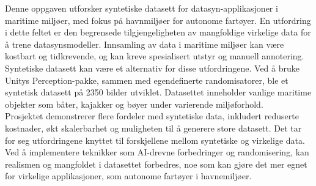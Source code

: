 

Denne oppgaven utforsker syntetiske datasett for datasyn-applikasjoner i maritime miljøer, med fokus på havnmiljøer for autonome fartøyer. En utfordring i dette feltet er den begrensede tilgjengeligheten av mangfoldige virkelige data for å trene datasynsmodeller. Innsamling av data i maritime miljøer kan være kostbart og tidkrevende, og kan kreve spesialisert utstyr og manuell annotering. Syntetiske datasett kan være et alternativ for disse utfordringene. Ved å bruke Unitys Perception-pakke, sammen med egendefinerte randomisatorer, ble et syntetisk datasett på 2350 bilder utviklet. Datasettet inneholder vanlige maritime objekter som båter, kajakker og bøyer under varierende miljøforhold.\\

\noindent Prosjektet demonstrerer flere fordeler med syntetiske data, inkludert reduserte kostnader, økt skalerbarhet og muligheten til å generere store datasett. Det tar for seg utfordringene knyttet til forskjellene mellom syntetiske og virkelige data. Ved å implementere teknikker som AI-drevne forbedringer og randomisering, kan realismen og mangfoldet i datasettet forbedres, noe som kan gjøre det mer egnet for virkelige applikasjoner, som autonome fartøyer i havnemiljøer.